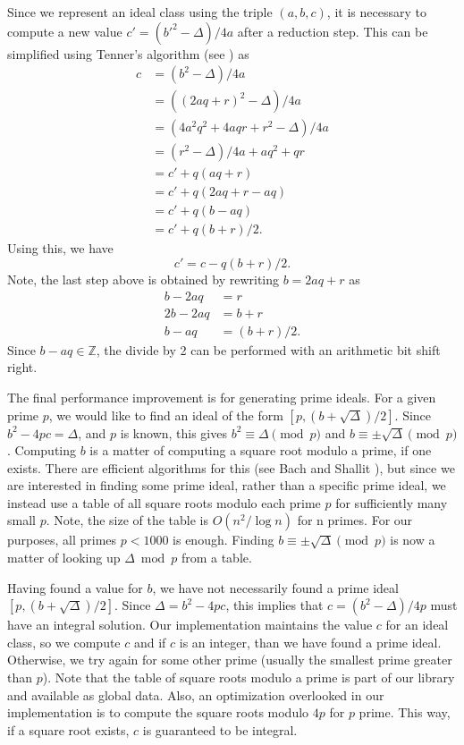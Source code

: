 \documentclass{ucalgthes1}
\theoremstyle{definition}
\newcommand{\ZZ}{\mathbb{Z}}
\begin{document}
Since we represent an ideal class using the triple $(a, b, c)$, it is necessary to compute a new value $c' = (b'^2 - \Delta)/4a$ after a reduction step.  This can be simplified using Tenner's algorithm (see \cite[\S 3.4]{Jacobson2009})  as
\begin{align*}
	c &= (b^2 - \Delta)/4a \\
	  &= ((2aq + r)^2 - \Delta)/4a \\
	  &= (4a^2q^2 + 4aqr + r^2 - \Delta)/4a \\
	  &= (r^2 - \Delta)/4a + aq^2 + qr \\
	  &= c' + q(aq + r) \\
	  &= c' + q(2aq + r - aq) \\
	  &= c' + q(b - aq) \\
	  &= c' + q(b + r)/2.
\end{align*}
Using this, we have
\[
c' = c - q(b + r)/2.
\]
Note, the last step above is obtained by rewriting $b = 2aq + r$ as
\begin{align*}
	b - 2aq &= r \\
	2b - 2aq &= b + r \\
	b - aq &= (b+r)/2.
\end{align*}
Since $b - aq \in \ZZ$, the divide by 2 can be performed with an arithmetic bit shift right.

The final performance improvement is for generating prime ideals.  For a given prime $p$, we would like to find an ideal of the form $[p, (b + \sqrt\Delta)/2]$.  Since $b^2 - 4pc = \Delta$, and $p$ is known, this gives $b^2 \equiv \Delta \pmod p$ and $b \equiv \pm \sqrt\Delta \pmod p$.  Computing $b$ is a matter of computing a square root modulo a prime, if one exists.  There are efficient algorithms for this (see Bach and Shallit \cite{Bach1996}), but since we are interested in finding some prime ideal, rather than a specific prime ideal, we instead use a table of all square roots modulo each prime $p$ for sufficiently many small $p$.  Note, the size of the table is $O(n^2/\log n)$ for n primes.  For our purposes, all primes $p < 1000$ is enough.  Finding $b \equiv \pm\sqrt\Delta \pmod p$ is now a matter of looking up $\Delta \bmod p$ from a table.  

Having found a value for $b$, we have not necessarily found a prime ideal $[p, (b + \sqrt\Delta)/2]$.  Since $\Delta = b^2 - 4pc$, this implies that $c = (b^2 - \Delta)/4p$ must have an integral solution.  Our implementation maintains the value $c$ for an ideal class, so we compute $c$ and if $c$ is an integer, than we have found a prime ideal.  Otherwise, we try again for some other prime (usually the smallest prime greater than $p$).  Note that the table of square roots modulo a prime is part of our library and available as global data.  Also, an optimization overlooked in our implementation is to compute the square roots modulo $4p$ for $p$ prime.  This way, if a square root exists, $c$ is guaranteed to be integral.
\end{document}
